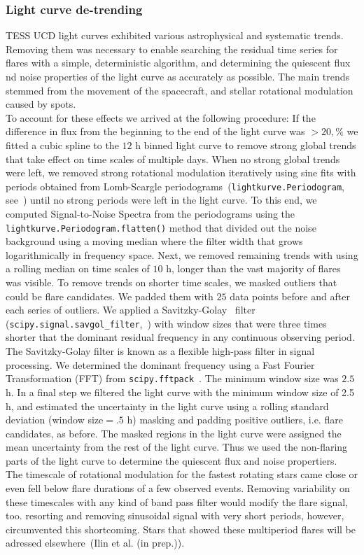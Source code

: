 \documentclass[twocolumn]{aastex62}
\begin{document}
\subsubsection{Light curve de-trending}
TESS UCD light curves exhibited various astrophysical and systematic trends. Removing them was necessary to enable searching the residual time series for flares with a simple, deterministic algorithm, and determining the quiescent flux nd noise properties of the light curve as accurately as possible. The main trends stemmed from the movement of the spacecraft, and stellar rotational modulation caused by spots.
\\
To account for these effects we arrived at the following procedure: If the difference in flux from the beginning to the end of the light curve was $>20,\%$ we fitted a cubic spline to the $12$ h binned light curve to remove strong global trends that take effect on time scales of multiple days. When no strong global trends were left, we removed strong rotational modulation iteratively using sine fits with periods obtained from  Lomb-Scargle periodograms~(\texttt{lightkurve.Periodogram}, see~\citealt{lomb1976,scargle1982}) until no strong periods were left in the light curve. To this end, we computed Signal-to-Noise Spectra from the periodograms using the \texttt{lightkurve.Periodogram.flatten()} method that divided out the noise background using a moving median where the filter width that grows logarithmically in frequency space.
Next, we removed remaining trends with using a rolling median on time scales of $10$ h, longer than the vast majority of flares was visible. To remove trends on shorter time scales, we masked outliers that could be flare candidates. We padded them with $25$ data points before and after each series of outliers. We applied a Savitzky-Golay~\citep{SavGol1964} filter (\texttt{scipy.signal.savgol\_filter},~\citealt{scipy2019}) with window sizes that were three times shorter that the dominant residual frequency in any continuous observing period. The Savitzky-Golay filter is known as a flexible high-pass filter in signal processing. We determined the dominant frequency using a Fast Fourier Transformation (FFT) from \texttt{scipy.fftpack}~\citep{scipy2019}. The minimum window size was $2.5$ h. In a final step we filtered the light curve with the minimum window size of 2.5 h, and estimated the uncertainty in the light curve using a rolling standard deviation (window size$= .5$ h) masking and padding positive outliers, i.e. flare candidates, as before. The masked regions in the light curve were assigned the mean uncertainty from the rest of the light curve. Thus we used the non-flaring parts of the light curve to determine the quiescent flux and noise propertiers.
\\
The timescale of rotational modulation for the fastest rotating stars came close or even fell below flare durations of a few observed events. Removing variability on these timescales with any kind of band pass filter would modify the flare signal, too.  resorting and removing sinusoidal signal with very short periods, however, circumvented this shortcoming. Stars that showed these multiperiod flares will be adressed elsewhere~(Ilin et al. (in prep.)).
\end{document}
